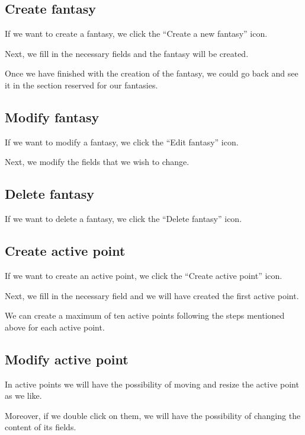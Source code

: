 \subsection{Create fantasy}
If we want to create a fantasy, we click the ``Create a new fantasy'' icon.

Next, we fill in the necessary fields and the fantasy will be created.

Once we have finished with the creation of the fantasy, we could go back and see it in the section reserved for our fantasies.

\subsection{Modify fantasy}
If we want to modify a fantasy, we click the ``Edit fantasy'' icon.

Next, we modify the fields that we wish to change.

\subsection{Delete fantasy}
If we want to delete a fantasy, we click the ``Delete fantasy'' icon.


\subsection{Create active point}
If we want to create an active point, we click the ``Create active point'' icon.

Next, we fill in the necessary field and we will have created the first active point.

We can create a maximum of ten active points following the steps mentioned above for each active point.

\subsection{Modify active point}
In active points we will have the possibility of moving and resize the active point as we like.

Moreover, if we double click on them, we will have the possibility of changing the content of its fields.


